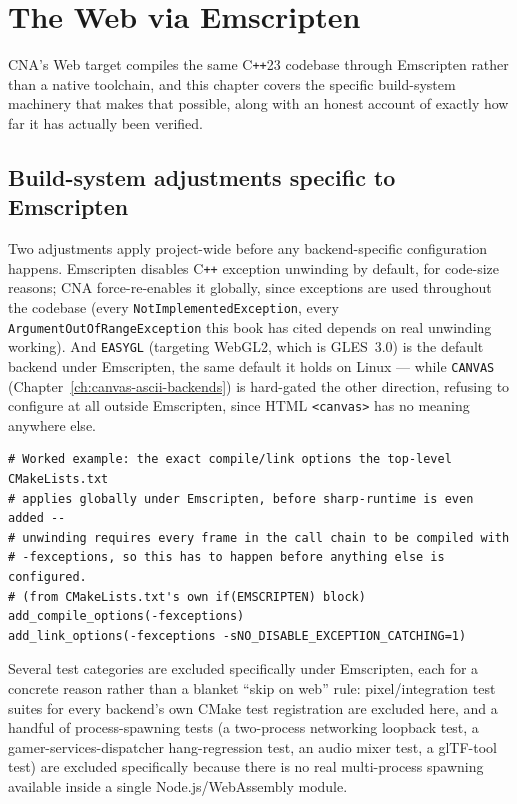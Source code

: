 \chapter{The Web via Emscripten}
\label{ch:web-emscripten}

CNA's Web target compiles the same C\texttt{++}23 codebase through Emscripten rather than a
native toolchain, and this chapter covers the specific build-system machinery that makes that
possible, along with an honest account of exactly how far it has actually been verified.

\section{Build-system adjustments specific to Emscripten}

Two adjustments apply project-wide before any backend-specific configuration happens.
Emscripten disables C\texttt{++} exception unwinding by default, for code-size reasons; CNA
force-re-enables it globally, since exceptions are used throughout the codebase (every
\texttt{NotImplementedException}, every \texttt{ArgumentOutOfRangeException} this book has
cited depends on real unwinding working). And \texttt{EASYGL} (targeting WebGL2, which is
GLES~3.0) is the default backend under Emscripten, the same default it holds on Linux ---
while \texttt{CANVAS} (Chapter~\ref{ch:canvas-ascii-backends}) is hard-gated the other
direction, refusing to configure at all outside Emscripten, since HTML \texttt{<canvas>} has
no meaning anywhere else.

\begin{lstlisting}[style=cnashell]
# Worked example: the exact compile/link options the top-level CMakeLists.txt
# applies globally under Emscripten, before sharp-runtime is even added --
# unwinding requires every frame in the call chain to be compiled with
# -fexceptions, so this has to happen before anything else is configured.
# (from CMakeLists.txt's own if(EMSCRIPTEN) block)
add_compile_options(-fexceptions)
add_link_options(-fexceptions -sNO_DISABLE_EXCEPTION_CATCHING=1)
\end{lstlisting}

Several test categories are excluded specifically under Emscripten, each for a concrete
reason rather than a blanket ``skip on web'' rule: pixel/integration test suites for every
backend's own CMake test registration are excluded here, and a handful of process-spawning
tests (a two-process networking loopback test, a gamer-services-dispatcher hang-regression
test, an audio mixer test, a glTF-tool test) are excluded specifically because there is no
real multi-process spawning available inside a single Node.js/WebAssembly module.

